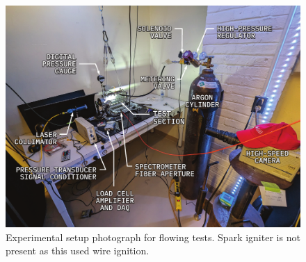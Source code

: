                 \begin{landscape}
                    \begin{figure}[h]
                        \centering
                        \includegraphics[]{assets/3 design/setupPhoto}
                        \caption[Experimental setup photograph for flowing tests]{Experimental setup photograph for flowing tests. Spark igniter is not present as this used wire ignition.}
                        \label{fig:setupPhoto}
                    \end{figure}
                \end{landscape}